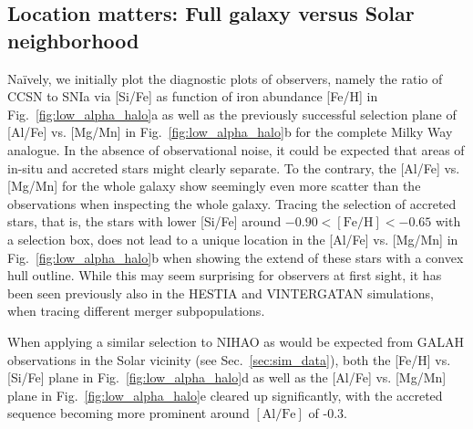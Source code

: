 \documentclass[fleqn,usenatbib]{mnras}
\begin{document}
\subsection{Location matters: Full galaxy versus Solar neighborhood} \label{sec:location}

Naïvely, we initially plot the diagnostic plots of observers, namely the ratio of CCSN to SNIa via [Si/Fe] as function of iron abundance [Fe/H] in Fig.~\ref{fig:low_alpha_halo}a as well as the previously successful selection plane of [Al/Fe] vs. [Mg/Mn] in Fig.~\ref{fig:low_alpha_halo}b for the complete Milky Way analogue. In the absence of observational noise, it could be expected that areas of in-situ and accreted stars might clearly separate. To the contrary, the [Al/Fe] vs. [Mg/Mn] for the whole galaxy show seemingly even more scatter than the observations when inspecting the whole galaxy. Tracing the selection of accreted stars, that is, the stars with lower [Si/Fe] around $-0.90 < \mathrm{[Fe/H]} < -0.65$ with a selection box, does not lead to a unique location in the [Al/Fe] vs. [Mg/Mn] in Fig.~\ref{fig:low_alpha_halo}b when showing the extend of these stars with a convex hull outline. While this may seem surprising for observers at first sight, it has been seen previously also in the \textsc{HESTIA} \citep[][see their Fig.~12]{Khoperskov2023c} and \textsc{VINTERGATAN} \citep[][see their Fig.~A2]{Rey2023} simulations, when tracing different merger subpopulations.

When applying a similar selection to NIHAO as would be expected from GALAH observations in the Solar vicinity (see Sec.~\ref{sec:sim_data}), both the [Fe/H] vs. [Si/Fe] plane in Fig.~\ref{fig:low_alpha_halo}d as well as the [Al/Fe] vs. [Mg/Mn] plane in Fig.~\ref{fig:low_alpha_halo}e cleared up significantly, with the accreted sequence becoming more prominent around $\mathrm{[Al/Fe]}$ of -0.3.
\end{document}
